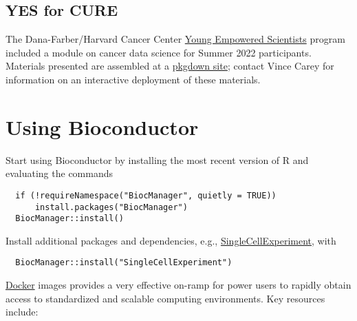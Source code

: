 \hypertarget{yes-for-cure}{%
\subsection{YES for CURE}\label{yes-for-cure}}

The Dana-Farber/Harvard Cancer Center \href{https://www.dfhcc.harvard.edu/research/cancer-disparities/students/yes-for-cure/}{Young Empowered Scientists} program included a module on cancer data science
for Summer 2022 participants. Materials presented are assembled at a \href{https://vjcitn.github.io/YESCDS}{pkgdown site}; contact Vince Carey for information on an interactive deployment of these materials.

\hypertarget{using-bioconductor}{%
\section{Using Bioconductor}\label{using-bioconductor}}

Start using
Bioconductor by installing the most recent version of R and evaluating
the commands

\begin{verbatim}
  if (!requireNamespace("BiocManager", quietly = TRUE))
      install.packages("BiocManager")
  BiocManager::install()
\end{verbatim}

Install additional packages and dependencies,
e.g., \href{https://bioconductor.org/packages/SingleCellExperiment}{SingleCellExperiment}, with

\begin{verbatim}
  BiocManager::install("SingleCellExperiment")
\end{verbatim}

\href{https://bioconductor.org/help/docker/}{Docker}
images provides a very effective on-ramp for power users to rapidly
obtain access to standardized and scalable computing environments.
Key resources include:


